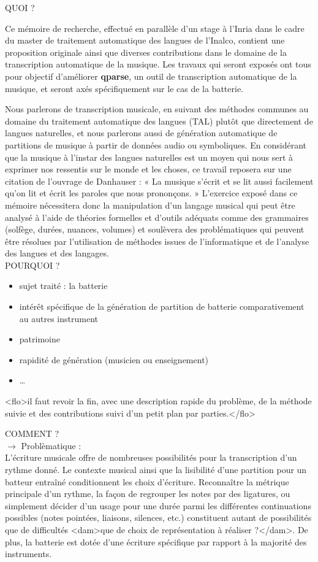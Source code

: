 QUOI ?

Ce mémoire de recherche, effectué en parallèle d’un stage à l’Inria dans le
cadre du master de traitement automatique des langues de l’Inalco, contient
une proposition originale ainsi que diverses contributions dans le domaine de
la transcription automatique de la musique. Les travaux qui seront exposés ont
tous pour objectif d’améliorer \textbf{qparse}, un outil de transcription
automatique de la musique, et seront axés spécifiquement sur le cas de la
batterie.

Nous parlerons de transcription musicale, en suivant des méthodes communes au
domaine du traitement automatique des langues (TAL) plutôt que directement de
langues naturelles, et nous parlerons aussi de génération automatique de
partitions de musique à partir de données audio ou symboliques. En considérant
que la musique à l’instar des langues naturelles est un moyen qui nous sert à
exprimer nos ressentis sur le monde et les choses, ce travail reposera sur une
citation de l’ouvrage de Danhauser \cite{danhauser} : « La musique s’écrit et
se lit aussi facilement qu’on lit et écrit les paroles que nous prononçons. »
L’exercice exposé dans ce mémoire nécessitera donc la manipulation d’un langage
musical qui peut être analysé à l’aide de théories formelles et d’outils
adéquats comme des grammaires (solfège, durées, nuances, volumes) et
soulèvera des problématiques qui peuvent être résolues par l’utilisation de
méthodes issues de l’informatique et de l’analyse des langues et des
langages.\\

POURQUOI ?
\begin{itemize}
	\item sujet traité : la batterie
	\item intérêt spécifique de la génération de partition de batterie comparativement
  au autres instrument
	\item patrimoine
	\item rapidité de génération (musicien ou enseignement)
	\item …\\
\end{itemize}

<flo>il faut revoir la fin, avec une description rapide du problème, de la
méthode suivie et des contributions suivi d'un petit plan par parties.</flo> 


COMMENT ?\\
$\to$ Problèmatique :\\
L’écriture musicale offre de nombreuses possibilités pour la transcription d’un
rythme donné. Le contexte musical ainsi que la lisibilité d’une partition pour
un batteur entraîné conditionnent les choix d’écriture. Reconnaître la
métrique principale d’un rythme, la façon de regrouper les notes par des
ligatures, ou simplement décider d’un usage pour une durée parmi les
différentes continuations possibles (notes pointées, liaisons, silences, etc.)
constituent autant de possibilités que de difficultés <dam>que de choix de
représentation à réaliser ?</dam>. De plus, la batterie est dotée d’une écriture
spécifique par rapport à la majorité des instruments.\\

